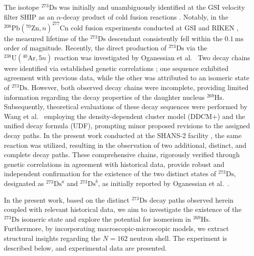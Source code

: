\documentclass[final,5p,times,twocolumn,number,sort&compress]{elsarticle}
\begin{document}
The isotope $^{273}\mathrm{Ds}$ was initially and unambiguously identified at the GSI velocity filter SHIP as an $\alpha$-decay product of cold fusion reactions \cite{hofmann2002NewResultsElements}. 
Notably, in the $^{208}\mathrm{Pb}(^{70}\mathrm{Zn}, n)^{277}\mathrm{Cn}$ cold fusion experiments conducted at GSI \cite{hofmann2002NewResultsElements,hofmann1996NewElement112} and RIKEN \cite{sumita2013NewResultProduction,morita2007ExperimentSynthesisIsotope277}, 
the measured lifetime of the $^{273}\mathrm{Ds}$ descendant consistently fell within the $0.1\ \mathrm{ms}$ order of magnitude. 
Recently, the direct production of $^{273}\mathrm{Ds}$ via the $^{238}\mathrm{U}(^{40}\mathrm{Ar}, 5n)$ reaction was investigated by Oganessian et al.\ \cite{oganessian2024SynthesisDecayProperties} %
Two decay chains were identified via established genetic correlations \cite{geneticcorrelations}; one sequence exhibited agreement with previous data, while the other was attributed to an isomeric state of $^{273}\mathrm{Ds}$.
However, both observed decay chains were incomplete, providing limited information regarding the decay properties of the daughter nucleus $^{269}\mathrm{Hs}$. 
Subsequently, theoretical evaluations of these decay sequences were performed by Wang et al.\ \cite{Wang2024} 
employing the density-dependent cluster model (DDCM+) and the unified decay formula (UDF), prompting minor proposed revisions to the assigned decay paths. 
In the present work conducted at the SHANS-2 facility \cite{xu2023GasfilledRecoilSeparator}, the same reaction was utilized, resulting in the observation of two additional, distinct, and complete decay paths. 
These comprehensive chains, rigorously verified through genetic correlations \cite{geneticcorrelations} in agreement with historical data, 
provide robust and independent confirmation for the existence of the two distinct states of $^{273}\mathrm{Ds}$, designated as $^{273}\mathrm{Ds}^{a}$ and $^{273}\mathrm{Ds}^{b}$, as initially reported by Oganessian et al.\ \cite{oganessian2024SynthesisDecayProperties}.

In the present work, based on the distinct $^{273}\mathrm{Ds}$ decay paths observed herein coupled with relevant historical data,
we aim to investigate the existence of the $^{273}\mathrm{Ds}$ isomeric state and explore the potential for isomerism in $^{269}\mathrm{Hs}$. 
Furthermore, by incorporating macroscopic-microscopic models, we extract structural insights regarding the $N=162$ neutron shell.
The experiment is described below, and experimental data are presented.
\end{document}
